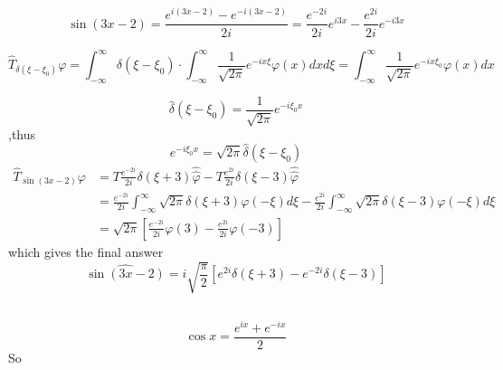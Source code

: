 \documentclass{article}
\begin{document}
\subsection{}
$$\sin ( 3 x - 2 ) = \frac { e ^ { i ( 3x - 2 ) } - e ^ { - i ( 3 x - 2 ) } } { 2 i } = \frac { e ^ { - 2 i } } { 2 i } e ^ { i 3 x } - \frac { e ^ { 2 i } } { 2 i } e ^ { - i 3 x }$$
	
$$\hat { T } _ { \delta \left( \xi - \xi _ { 0 } \right) } \varphi= \int _ { - \infty } ^ { \infty } \delta \left( \xi - \xi _ { 0 } \right) \cdot \int _ { - \infty } ^ { \infty } \frac { 1 } { \sqrt { 2 \pi } } e ^ { - i x \xi } \varphi ( x ) d x d\xi	= \int _ { - \infty } ^ { \infty } \frac { 1 } { \sqrt { 2 \pi } } e ^ { - i x \xi _ { 0 }} \varphi ( x ) d x$$
	
$$\hat { \delta } \left( \xi - \xi _ { 0 } \right) = \frac { 1 } { \sqrt { 2 \pi } } e ^ { - i \xi _ { 0 } x }$$,thus $$e ^ { - i \xi _ { 0 } x } = \sqrt { 2 \pi } \hat { \delta } \left( \xi - \xi _ { 0 } \right)$$
\begin{align*}
	\hat { T }_{\sin ( 3 x - 2 )}  \varphi &= T \frac { e ^ { - 2i } } { 2 i } \delta ( \xi + 3 ) \hat{\hat { \varphi }} - T \frac { e ^ { 2 i } } { 2 i } \delta ( \xi - 3 )\hat{\hat { \varphi }}	\\
&=\frac { e ^ { - 2 i } } { 2 i } \int _ { - \infty } ^ { \infty } \sqrt { 2 \pi } \delta ( \xi + 3 ) \varphi ( - \xi ) d \xi - \frac { e ^ { 2 i } } { 2 i } \int _ { - \infty } ^ { \infty } \sqrt { 2 \pi } \delta ( \xi - 3 ) \varphi ( - \xi ) d \xi\\
&= \sqrt { 2 \pi }\left[ \frac { e ^ { - 2 i} } { 2 i }\varphi ( 3 ) - \frac { e ^ { 2 i } } { 2 i } \varphi ( - 3 ) \right] 
\end{align*}	
which gives the final answer
$$\widehat { \sin ( 3x - 2 ) } =i  \sqrt { \frac { \pi } { 2 } } \left[ e ^ { 2 i  } \delta ( \xi + 3 ) - e ^ { - 2 i  } \delta ( \xi - 3 ) \right]$$

\subsection{}
$$\cos x = \frac { e ^ { i x } + e ^ { - i x } } { 2 }$$
So
\end{document}
